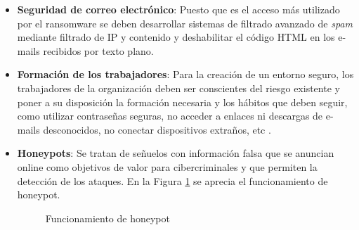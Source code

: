 \begin{itemize}
    \item \textbf{Seguridad de correo electrónico}: Puesto que es el acceso más utilizado por el ransomware se deben desarrollar sistemas de filtrado avanzado de \textit{spam} mediante filtrado de \gls{IP} y contenido y deshabilitar el código \gls{HTML} en los e-mails recibidos por texto plano.
    \item \textbf{Formación de los trabajadores}: Para la creación de un entorno seguro, los trabajadores de la organización deben ser conscientes del riesgo existente y poner a su disposición la formación necesaria y los hábitos que deben seguir, como utilizar contraseñas seguras, no acceder a enlaces ni descargas de e-mails desconocidos, no conectar dispositivos extraños, etc \cite{TOPAYORNOT}.
    \item \textbf{Honeypots}: Se tratan de señuelos con información falsa que se anuncian online como objetivos de valor para cibercriminales y que permiten la detección de los ataques. En la Figura \ref{fig:im10} se aprecia el funcionamiento de honeypot.
    \begin{figure}[htb]
        \begin{center}
        {}
        \end{center}
        \caption{Funcionamiento de honeypot}
        \label{fig:im10}
    \end{figure}
\end{itemize}


